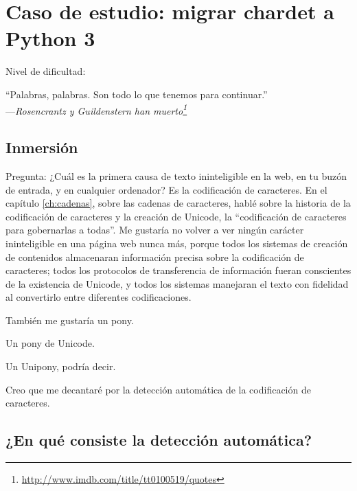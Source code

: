 
\chapter{Caso de estudio: migrar chardet a Python 3}\label{ch:chardet}

\noindent Nivel de dificultad:\diflllll

\begin{citaCap}
    ``Palabras, palabras. Son todo lo que tenemos para continuar.'' \\
        ---\emph{Rosencrantz y Guildenstern han muerto\footnote{\href{http://www.imdb.com/title/tt0100519/quotes}{http://www.imdb.com/title/tt0100519/quotes}}}
\end{citaCap}

\section{Inmersión}

Pregunta: ¿Cuál es la primera causa de texto ininteligible en la web, en tu buzón de entrada, y en cualquier ordenador? Es la codificación de caracteres. En el capítulo \ref{ch:cadenas}, sobre las cadenas de caracteres, hablé sobre la historia de la codificación de caracteres y la creación de Unicode, la “codificación de caracteres para gobernarlas a todas”. Me gustaría no volver a ver ningún carácter ininteligible en una página web nunca más, porque todos los sistemas de creación de contenidos almacenaran información precisa sobre la codificación de caracteres; todos los protocolos de transferencia de información fueran conscientes de la existencia de Unicode, y todos los sistemas manejaran el texto con fidelidad al convertirlo entre diferentes codificaciones.

También me gustaría un pony.

Un pony de Unicode.

Un Unipony, podría decir.

Creo que me decantaré por la detección automática de la codificación de caracteres.

\section{¿En qué consiste la detección automática?}

